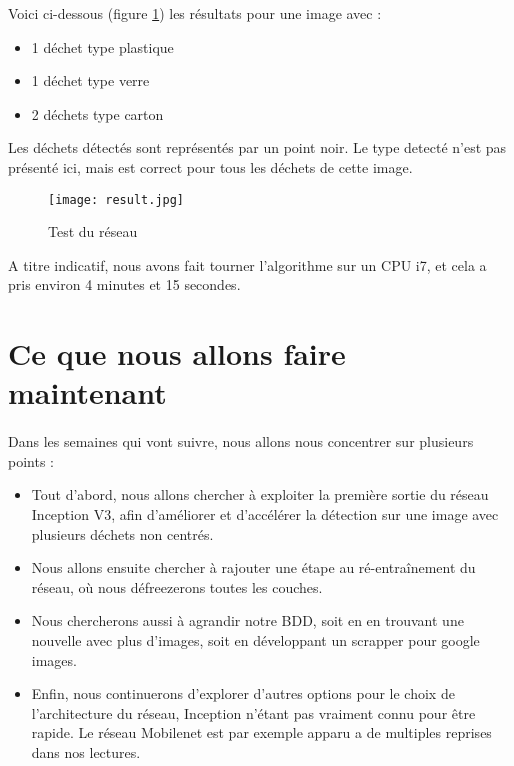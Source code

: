 \documentclass[12pt,a4paper,twocolumn]{article}
\begin{document}
Voici ci-dessous (figure \ref{result}) les résultats pour une image avec :
\begin{itemize}
  \item 1 déchet type plastique
  \item 1 déchet type verre
  \item 2 déchets type carton
\end{itemize}

Les déchets détectés sont représentés par un point noir. Le type detecté n'est pas présenté ici, mais est correct pour tous les déchets de cette image.

\begin{figure}[H]
	\center
	\texttt{[image: result.jpg]}
	\caption{Test du réseau}
	\label{result}
\end{figure}

A titre indicatif, nous avons fait tourner l’algorithme sur un CPU i7, et cela a pris environ 4 minutes et 15 secondes.

\section{Ce que nous allons faire maintenant}

\paragraph*{}

Dans les semaines qui vont suivre, nous allons nous concentrer sur plusieurs points :
\begin{itemize}
  \item Tout d’abord, nous allons chercher à exploiter la première sortie du réseau Inception V3, afin d’améliorer et d’accélérer la détection sur une image avec plusieurs déchets non centrés.
  \item Nous allons ensuite chercher à rajouter une étape au ré-entraînement du réseau, où nous défreezerons toutes les couches.
  \item Nous chercherons aussi à agrandir notre BDD, soit en en trouvant une nouvelle avec plus d'images, soit en développant un scrapper pour google images.
  \item Enfin, nous continuerons d'explorer d'autres options pour le choix de l'architecture du réseau, Inception n'étant pas vraiment connu pour être rapide. Le réseau Mobilenet est par exemple apparu a de multiples reprises dans nos lectures.
\end{itemize}
\end{document}
